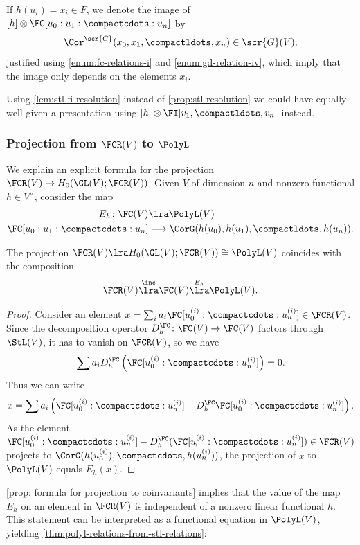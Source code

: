 \documentclass[a4paper]{amsart}
\begin{document}
If $h(u_i) = x_i \in F$, we denote the image of $[h] \otimes \FC[u_0:u_1:\compactcdots : u_n]$ by
\[\Cor^\scr{G}(x_0,x_1,\compactldots,x_n) \in \scr{G}(V),\] 
justified using \eqref{enum:fc-relations-i} and \eqref{enum:gd-relation-iv}, which imply that the image only depends on the elements $x_i$.

\begin{remark}Using \cref{lem:stl-fi-resolution} instead of \cref{prop:stl-resolution} we could have equally well given a presentation using $[h] \otimes \FI[v_1,\compactldots,v_n]$ instead.
\end{remark}

\subsubsection{Projection from $\FCR(V)$ to $\PolyL$}\label{section: projection from FC to G} We explain an explicit formula for the projection $\FCR(V)\to H_0(\GL(V);\FCR(V))$. Given $V$ of dimension $n$ and nonzero functional $h\in V^{\vee}$, consider the map
\begin{align*} E_h\colon \FC(V) &\lra \PolyL(V) \\
\FC[u_0:u_1:\compactcdots:u_n] &\longmapsto \CorG(h(u_0),h(u_1),\compactldots,h(u_n)).
\end{align*}

\begin{proposition}\label{prop: formula for projection to coinvariants}
The projection $\FCR(V)\lra H_0(\GL(V);\FCR(V))\cong \PolyL(V)$ coincides with the composition
\[
\FCR(V) \overset{\inc}\lra \FC(V) \overset{E_h}{\lra} \PolyL(V).
\]
\end{proposition} 
\begin{proof}
Consider an element $
x= \sum_i a_i \FC[u_0^{(i)}:\compactcdots:u_n^{(i)}]\in  \FCR(V)$. Since the decomposition operator $D_h^{\FC}\colon \FC(V)\to \FC(V)$  factors through $\StL(V)$, it has to vanish on $\FCR(V)$, so we have
\[
 \sum a_i D_h^{\FC}\left( \FC[u_0^{(i)}:\compactcdots:u_n^{(i)}]\right)=0.
\]
Thus we can write
\[
x= \sum a_i \left(\FC[u_0^{(i)}:\compactcdots:u_n^{(i)}]-D_h^{\FC}\FC[u_0^{(i)}:\compactcdots:u_n^{(i)}]\right).
\]
As the element $\FC[u_0^{(i)}:\compactcdots:u_n^{(i)}]-D_h^{\FC}(\FC[u_0^{(i)}:\compactcdots:u_n^{(i)}])\in \FCR(V)$ projects to $\CorG(h(u_0^{(i)}),\compactcdots, h(u_n^{(i)}))$, the projection of $x$ to $\PolyL(V)$ equals $E_h(x)$. 
\end{proof}

\cref{prop: formula for projection to coinvariants} implies that the value of the map $E_h$ on an element in $\FCR(V)$ is independent of a nonzero linear functional $h$. This statement can be interpreted as a functional equation in $\PolyL(V)$, yielding \cref{thm:polyl-relations-from-stl-relations}:
\end{document}
